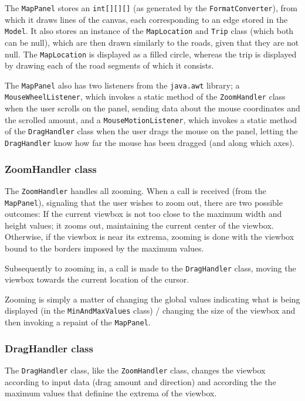 The \texttt{MapPanel} stores an \texttt{int[][][]} (as generated by the \texttt{FormatConverter}), from which it draws lines of the canvas, each corresponding to an edge stored in the \texttt{Model}. It also stores an instance of the \texttt{MapLocation} and \texttt{Trip} class (which both can be null), which are then drawn similarly to the roads, given that they are not null. The \texttt{MapLocation} is displayed as a filled circle, whereas the trip is displayed by drawing each of the road segments of which it consists.

The \texttt{MapPanel} also has two listeners from the \texttt{java.awt} library; a \\\texttt{MouseWheelListener}, which invokes a static method of the \texttt{ZoomHandler} class when the user scrolls on the panel, sending data about the mouse coordinates and the scrolled amount, and a \texttt{MouseMotionListener}, which invokes a static method of the \texttt{DragHandler} class when the user drags the mouse on the panel, letting the \texttt{DragHandler} know how far the mouse has been dragged (and along which axes).

\subsubsection{ZoomHandler class} %
The \texttt{ZoomHandler} handles all zooming. When a call is received (from the \texttt{MapPanel}), signaling that the user wishes to zoom out, there are two possible outcomes: If the current viewbox is not too close to the maximum width and height values; it zooms out, maintaining the current center of the viewbox. Otherwise, if the viewbox is near its extrema, zooming is done with the viewbox bound to the borders imposed by the maximum values.

Subsequently to zooming in, a call is made to the \texttt{DragHandler} class, moving the viewbox towards the current location of the cursor.

Zooming is simply a matter of changing the global values indicating what is being displayed (in the \texttt{MinAndMaxValues} class) / changing the size of the viewbox and then invoking a repaint of the \texttt{MapPanel}.

\subsubsection{DragHandler class} %
The \texttt{DragHandler} class, like the \texttt{ZoomHandler} class, changes the viewbox according to input data (drag amount and direction) and according the the maximum values that definine the extrema of the viewbox.

